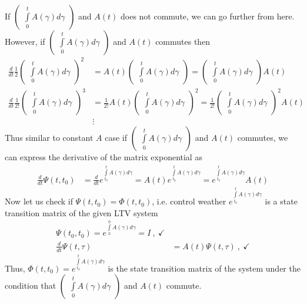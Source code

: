\documentclass[twoside]{article}
\begin{document}
%
If $\begin{pmatrix} \int\limits_{0}^{t} A(\gamma) d\gamma \end{pmatrix}$ and $A(t)$ does not commute, we can go further from here. However, if $\begin{pmatrix} \int\limits_{0}^{t} A(\gamma) d\gamma \end{pmatrix}$ and $A(t)$ commutes then 
%
\begin{align*}
\frac{d}{dt} \frac{1}{2} \begin{pmatrix} \int\limits_{0}^{t} A(\gamma) d\gamma \end{pmatrix}^2 &=  A(t) \begin{pmatrix} \int\limits_{0}^{t} A(\gamma) d\gamma \end{pmatrix} 
= \begin{pmatrix} \int\limits_{0}^{t} A(\gamma) d\gamma \end{pmatrix} A(t) 
\\
\frac{d}{dt} \frac{1}{2 !} \begin{pmatrix} \int\limits_{0}^{t} A(\gamma) d\gamma \end{pmatrix}^3 &= \frac{1}{2 !}  A(t) \begin{pmatrix} \int\limits_{0}^{t} A(\gamma) d\gamma \end{pmatrix}^2
= \frac{1}{2 !} \begin{pmatrix} \int\limits_{0}^{t} A(\gamma) d\gamma \end{pmatrix}^2 A(t) 
\\
&\vdots
\end{align*}
%
Thus similar to constant $A$ case if $\begin{pmatrix} \int\limits_{0}^{t} A(\gamma) d\gamma \end{pmatrix}$ and $A(t)$ commutes, we can express the derivative of the matrix exponential as
%
\begin{align*}
\frac{d}{dt} \Psi(t,t_0) &= \frac{d}{dt} e^{ \int\limits_{t_0}^{t} A(\gamma) d\gamma }  = A(t) e^{ \int\limits_{t_0}^{t} A(\gamma) d\gamma } = e^{ \int\limits_{t_0}^{t} A(\gamma) d\gamma } A(t)
\end{align*}
% 
Now let us check if $\Psi(t,t_0) = \Phi(t,t_0)$, i.e. control weather $e^{ \int\limits_{t_0}^{t} A(\gamma) d\gamma }$ is a state transition matrix of the given LTV system
%
\begin{align*}
\Psi(t_0,t_0) = e^{ \int\limits_{0}^{0} A(\gamma) d\gamma } = I \ , \ \checkmark
\\
\frac{d}{dt} \Psi(t,\tau) &= A(t) \Psi(t,\tau) \ , \ \checkmark
\end{align*}
%
Thus, $\Phi(t,t_0)  = e^{ \int\limits_{t_0}^{t} A(\gamma) d\gamma }$ is the state transition matrix of the system under the condition that
$\begin{pmatrix} \int\limits_{0}^{t} A(\gamma) d\gamma \end{pmatrix}$ and $A(t)$ commute.
\end{document}
